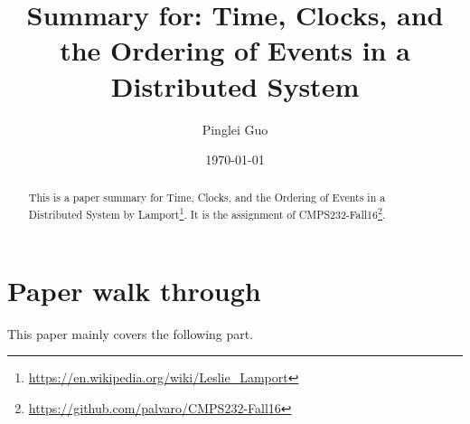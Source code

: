 \documentclass[12pt,a4paper,oneside]{article}
\title{Summary for: Time, Clocks, and the Ordering of Events in a Distributed System}
\author{Pinglei Guo}
\date{\today}
\begin{document}
\maketitle

\begin{abstract}

This is a paper summary for Time, Clocks, and the Ordering of Events in a Distributed System\cite{lamport1978time} by Lamport\footnote{\url{https://en.wikipedia.org/wiki/Leslie_Lamport}}.
It is the assignment of CMPS232-Fall16\footnote{\url{https://github.com/palvaro/CMPS232-Fall16}}.

\end{abstract}


\section{Paper walk through}

This paper mainly covers the following part.
\end{document}
